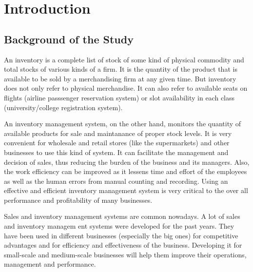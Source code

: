 \documentclass[journal]{./IEEE/IEEEtran}
\title{\SPTITLE}
\author{\ADVISEE~and~\ADVISER%
\REMARK
}
\begin{document}
\maketitle

\begin{abstract}
A Sales and Inventory Management System for Small-Scale Pawnshop Business was developed using PHP language, CodeIgniter framework, PostgreSQL database, Apache2 server and MaterializeCSS. This project was developed to help the small-scale pawnshop owners in tracking and monitoring their inventory and sales.It aims to handle all the transactions of the business effficiently and effectively.
\end{abstract}



\section{Introduction}

\subsection{Background of the Study}
An inventory is a complete list of stock of some kind of physical commodity and total stocks of various kinds of a firm. It is the quantity of the product that is available to be sold by a merchandising firm at any given time. But  inventory does not only refer to physical merchandise. It can also refer to available seats on flights (airline passsenger reservation system) or slot availability in each class (university/college registration system). \cite{anigbogu11}

An inventory management system, on the other hand, monitors the quantity of available products for sale and maintanance of proper stock levels. It is very convenient for wholesale and retail stores (like the supermarkets) and other businesses to use this kind of system. It can facilitate the management and decision of sales, thus reducing the burden of the business and its managers. \cite{ren13} Also, the work efficiency can be improved as it lessens time and effort of the employees as well as the human errors from manual counting and recording. \cite{rajeswari16} Using an effective and efficient inventory management system is very critical to the over all performance and profitability of many businesses.

Sales and inventory management systems are common nowadays. A lot of sales and inventory managem ent systems were developed for the past years. They have been used in different businesses (especially the big ones) for competitive advantages and for efficiency and effectiveness of the business. Developing it for small-scale and medium-scale businesses will help them improve their operations, management and performance.
\end{document}
